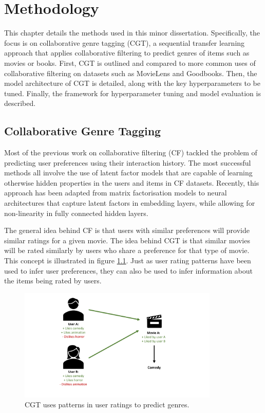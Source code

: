 \chapter{Methodology}
This chapter details the methods used in this minor dissertation. Specifically, the focus is on collaborative genre tagging (CGT), a sequential transfer learning approach that applies collaborative filtering to predict genres of items such as movies or books. First, CGT is outlined and compared to more common uses of collaborative filtering on datasets such as MovieLens and Goodbooks. Then, the model architecture of CGT is detailed, along with the key hyperparameters to be tuned. Finally, the framework for hyperparameter tuning and model evaluation is described.

\section{Collaborative Genre Tagging}
Most of the previous work on collaborative filtering (CF) tackled the problem of predicting user preferences using their interaction history. The most successful methods all involve the use of latent factor models that are capable of learning otherwise hidden properties in the users and items in CF datasets. Recently, this approach has been adapted from matrix factorisation models to neural architectures that capture latent factors in embedding layers, while allowing for non-linearity in fully connected hidden layers.

The general idea behind CF is that users with similar preferences will provide similar ratings for a given movie. The idea behind CGT is that similar movies will be rated similarly by users who share a preference for that type of movie. This concept is illustrated in figure \ref{fig:4_CGT-concept}. Just as user rating patterns have been used to infer user preferences, they can also be used to infer information about the items being rated by users.

\begin{figure}[H]
\centering
\includegraphics[width=0.85\textwidth]{Figures/4_CGT-concept.pdf}
\decoRule
\caption[Collaborative genre tagging concept]{CGT uses patterns in user ratings to predict genres.}
\label{fig:4_CGT-concept}
\end{figure}

